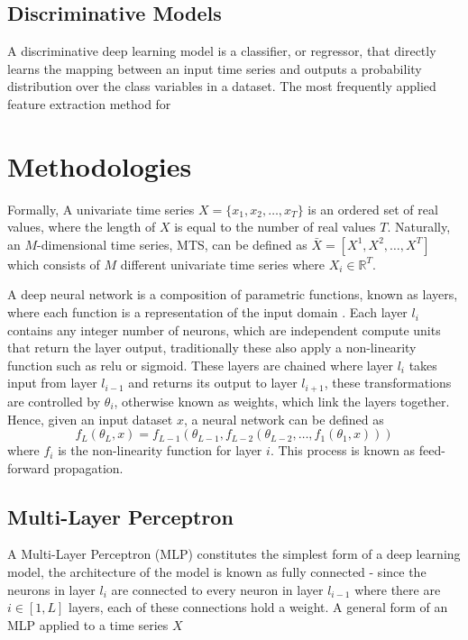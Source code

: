 \documentclass[journal]{IEEEtran}
\begin{document}
\subsection{Discriminative Models}
A discriminative deep learning model is a classifier, or regressor, that directly learns the mapping between an input time series and outputs a probability distribution over the class variables in a dataset. The most frequently applied feature extraction method for 

\section{Methodologies}

Formally, A univariate time series $X = \{x_1, x_2, \dots, x_T\}$ is an ordered set of real values, where the length of $X$ is equal to the number of real values $T$. Naturally, an $M$-dimensional time series, MTS, can be defined as $\bar{X} = [X^1, X^2, \dots, X^T]$ which consists of $M$ different univariate time series where $X_i \in \mathbb{R}^T$.

A deep neural network is a composition of parametric functions, known as layers, where each function is a representation of the input domain \cite{papernot2018}. Each layer $l_i$ contains any integer number of neurons, which are independent compute units that return the layer output, traditionally these also apply a non-linearity function such as relu or sigmoid. These layers are chained where layer $l_i$ takes input from layer $l_{i-1}$ and returns its output to layer $l_{i+1}$, these transformations are controlled by $\theta_i$, otherwise known as weights, which link the layers together. Hence, given an input dataset $x$, a neural network can be defined as
\begin{equation}\label{eq:dnn}
    f_L(\theta_L, x) = f_{L-1}(\theta_{L-1}, f_{L-2}(\theta_{L-2}, \dots, f_1(\theta_1, x)))
\end{equation}
where $f_i$ is the non-linearity function for layer $i$. This process is known as feed-forward propagation.



\subsection{Multi-Layer Perceptron}
A Multi-Layer Perceptron (MLP) constitutes the simplest form of a deep learning model, the architecture of the model is known as fully connected - since the neurons in layer $l_i$ are connected to every neuron in layer $l_{i-1}$ where there are $i \in [1,L]$ layers, each of these connections hold a weight. A general form of an MLP applied to a time series $X$
\end{document}
